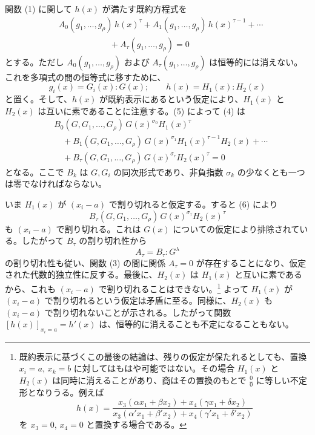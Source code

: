 \documentclass[11pt]{article}
\begin{document}
関数 (1) に関して $h(x)$ が満たす既約方程式を
\begin{equation}
\begin{aligned}
&A_0(g_1,\ldots,g_\rho)\,h(x)^\tau
 +A_1(g_1,\ldots,g_\rho)\,h(x)^{\tau-1}
 +\cdots \\
&\hspace{6em}+A_\tau(g_1,\ldots,g_\rho)=0
\end{aligned}
\tag{4}
\end{equation}
とする。ただし $A_0(g_1,\ldots,g_\rho)$ および $A_\tau(g_1,\ldots,g_\rho)$ は恒等的には消えない。これを多項式の間の恒等式に移すために、
\begin{equation}
  g_i(x)=G_i(x):G(x);\qquad h(x)=H_1(x):H_2(x)
\tag{5}
\end{equation}
と置く。そして、$h(x)$ が既約表示にあるという仮定により、$H_1(x)$ と $H_2(x)$ は互いに素であることに注意する。(5) によって (4) は
\begin{equation}
\begin{aligned}
&B_0(G,G_1,\ldots,G_\rho)\,G(x)^{\sigma_0}H_1(x)^\tau \\
&\quad+B_1(G,G_1,\ldots,G_\rho)\,G(x)^{\sigma_1}H_1(x)^{\tau-1}H_2(x)+\cdots \\
&\quad+B_\tau(G,G_1,\ldots,G_\rho)\,G(x)^{\sigma_\tau}H_2(x)^\tau=0
\end{aligned}
\tag{6}
\end{equation}
となる。ここで $B_k$ は $G,G_i$ の同次形式であり、非負指数 $\sigma_k$ の少なくとも一つは零でなければならない。

いま $H_1(x)$ が $(x_i-a)$ で割り切れると仮定する。すると (6) により
\[
  B_\tau(G,G_1,\ldots,G_\rho)\,G(x)^{\sigma_\tau}H_2(x)^\tau
\]
も $(x_i-a)$ で割り切れる。これは $G(x)$ についての仮定により排除されている。したがって $B_\tau$ の割り切れ性から
\[
  A_\tau=B_\tau:G^\lambda
\]
の割り切れ性も従い、関数 (3) の間に関係 $A_\tau=0$ が存在することになり、仮定された代数的独立性に反する。最後に、$H_2(x)$ は $H_1(x)$ と互いに素であるから、これも $(x_i-a)$ で割り切れることはできない。\footnote{既約表示に基づくこの最後の結論は、残りの仮定が保たれるとしても、置換 $x_i=a$, $x_k=b$ に対してはもはや可能ではない。その場合 $H_1(x)$ と $H_2(x)$ は同時に消えることがあり、商はその置換のもとで $\frac{0}{0}$ に等しい不定形となりうる。例えば
\[
 h(x)=\frac{x_3(\alpha x_1+\beta x_2)+x_4(\gamma x_1+\delta x_2)}
 {x_3(\alpha' x_1+\beta' x_2)+x_4(\gamma' x_1+\delta' x_2)}
\]
を $x_3=0$, $x_4=0$ と置換する場合である。} よって $H_1(x)$ が $(x_i-a)$ で割り切れるという仮定は矛盾に至る。同様に、$H_2(x)$ も $(x_i-a)$ で割り切れないことが示される。したがって関数 $[h(x)]_{x_i=a}=h'(x)$ は、恒等的に消えることも不定になることもない。
\end{document}
